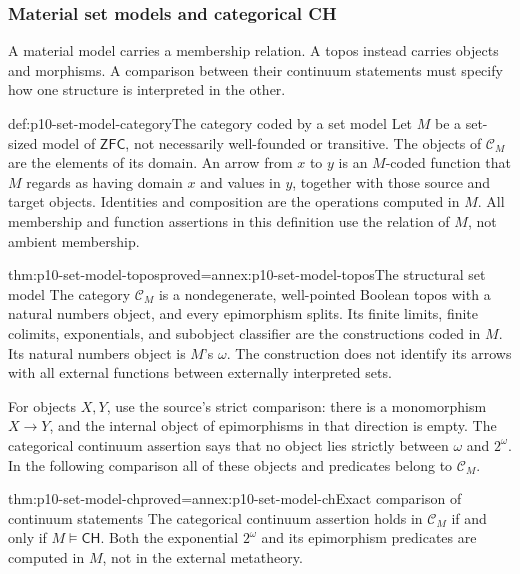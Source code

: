 \subsubsection{Material set models and categorical CH}
\label{sec:p10-set-models-structural-ch}

A material model carries a membership relation. A topos instead
carries objects and morphisms. A comparison between their continuum
statements must specify how one structure is interpreted in the other.

\begin{hbdefinition}{def:p10-set-model-category}{The category coded by a set model}
Let \(M\) be a set-sized model of \(\mathsf{ZFC}\), not necessarily
well-founded or transitive.
The objects of \(\mathcal C_M\) are the elements of its domain.
An arrow from \(x\) to \(y\) is an \(M\)-coded function that \(M\)
regards as having domain \(x\) and values in \(y\), together with
those source and target objects. Identities and composition are
the operations computed in \(M\).
All membership and function assertions in this definition use
the relation of \(M\), not ambient membership.
\end{hbdefinition}

\begin{hbtheorem}{thm:p10-set-model-topos}{proved=annex:p10-set-model-topos}{The structural set model}
The category \(\mathcal C_M\) is a nondegenerate, well-pointed
Boolean topos with a natural numbers object, and every epimorphism
splits. Its finite limits, finite colimits, exponentials, and
subobject classifier are the constructions coded in \(M\).
Its natural numbers object is \(M\)'s \(\omega\).
The construction does not identify its arrows with all external
functions between externally interpreted sets.
\end{hbtheorem}

For objects \(X,Y\), use the source's strict comparison:
there is a monomorphism \(X\to Y\), and the internal object of
epimorphisms in that direction is empty.
The categorical continuum assertion says that no object lies
strictly between \(\omega\) and \(2^\omega\).
In the following comparison all of these objects and predicates
belong to \(\mathcal C_M\).

\begin{hbtheorem}{thm:p10-set-model-ch}{proved=annex:p10-set-model-ch}{Exact comparison of continuum statements}
The categorical continuum assertion holds in \(\mathcal C_M\)
if and only if \(M\models\mathsf{CH}\).
Both the exponential \(2^\omega\) and its epimorphism predicates
are computed in \(M\), not in the external metatheory.
\end{hbtheorem}

